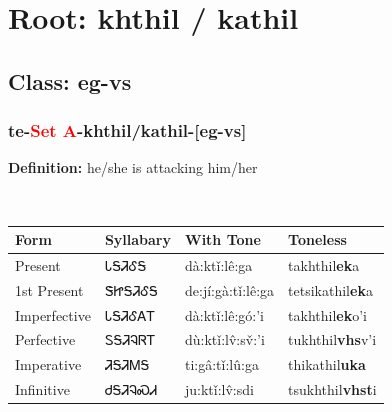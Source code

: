 \needspace{4in}
\section*{Root: khthil / kathil}
\nopagebreak
{}
\needspace{3in}
\subsection*{Class: eg-vs}
\nopagebreak
\needspace{2in}
\subsubsection*{te{-}\textcolor{Red}{Set A}{-}\textbf{khthil/kathil}{-}[eg-vs]}
\nopagebreak
\textbf{Definition: } he/she is attacking him/her
\\[0.5em]
\begin{tabularx}{\textwidth}{l X X X}%
\toprule%
\textbf{Form}&\textbf{Syllabary}&\textbf{With Tone}&\textbf{Toneless}\\%
\midrule%
Present&ᏓᎦᏘᎴᎦ&dà:ktǐ:lê:ga&takhthil\textbf{ek}a\\%
1st Present&ᏕᏥᎦᏘᎴᎦ&de:jí:gà:tǐ:lê:ga&tetsikathil\textbf{ek}a\\%
Imperfective&ᏓᎦᏘᎴᎪᎢ&dà:ktǐ:lê:gó:’i&takhthil\textbf{ek}o'i\\%
Perfective&ᏚᎦᏘᎸᏒᎢ&dù:ktǐ:lv̂:sv̌:’i&tukhthil\textbf{vhs}v'i\\%
Imperative&ᏘᎦᏘᎷᎦ&ti:gâ:tǐ:lû:ga&thikathil\textbf{uka}\\%
Infinitive&ᏧᎦᏘᎸᏍᏗ&ju:ktǐ:lv̂:sdi&tsukhthil\textbf{vhst}i\\%
\bottomrule%
\end{tabularx}
\\[1em]